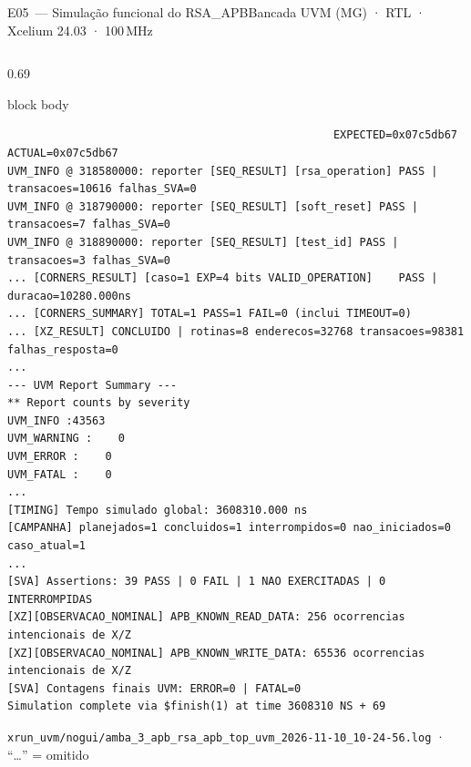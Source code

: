 \documentclass[aspectratio=169,10pt,t]{beamer}
\begin{document}
\begin{frame}[fragile]{E05~— Simulação funcional do RSA\_APB}{Bancada UVM (MG) · RTL · Xcelium 24.03 · 100\,MHz}
\begin{columns}[T]
\begin{column}{0.69\textwidth}
\begin{beamercolorbox}[rounded=true,shadow=false,sep=3pt]{block body}
\begin{verbatim}
                                                  EXPECTED=0x07c5db67 ACTUAL=0x07c5db67
UVM_INFO @ 318580000: reporter [SEQ_RESULT] [rsa_operation] PASS | transacoes=10616 falhas_SVA=0
UVM_INFO @ 318790000: reporter [SEQ_RESULT] [soft_reset] PASS | transacoes=7 falhas_SVA=0
UVM_INFO @ 318890000: reporter [SEQ_RESULT] [test_id] PASS | transacoes=3 falhas_SVA=0
... [CORNERS_RESULT] [caso=1 EXP=4 bits VALID_OPERATION]    PASS | duracao=10280.000ns
... [CORNERS_SUMMARY] TOTAL=1 PASS=1 FAIL=0 (inclui TIMEOUT=0)
... [XZ_RESULT] CONCLUIDO | rotinas=8 enderecos=32768 transacoes=98381 falhas_resposta=0
...
--- UVM Report Summary ---
** Report counts by severity
UVM_INFO :43563
UVM_WARNING :    0
UVM_ERROR :    0
UVM_FATAL :    0
...
[TIMING] Tempo simulado global: 3608310.000 ns
[CAMPANHA] planejados=1 concluidos=1 interrompidos=0 nao_iniciados=0 caso_atual=1
...
[SVA] Assertions: 39 PASS | 0 FAIL | 1 NAO EXERCITADAS | 0 INTERROMPIDAS
[XZ][OBSERVACAO_NOMINAL] APB_KNOWN_READ_DATA: 256 ocorrencias intencionais de X/Z
[XZ][OBSERVACAO_NOMINAL] APB_KNOWN_WRITE_DATA: 65536 ocorrencias intencionais de X/Z
[SVA] Contagens finais UVM: ERROR=0 | FATAL=0
Simulation complete via $finish(1) at time 3608310 NS + 69
\end{verbatim}
\vspace*{-0.6\baselineskip}
      \end{beamercolorbox}
      {\tiny \texttt{xrun\_uvm/nogui/amba\_3\_apb\_rsa\_apb\_top\_uvm\_2026-11-10\_10-24-56.log} · ``\dots'' = omitido}
    \end{column}
  \end{columns}
\end{frame}
\end{document}
